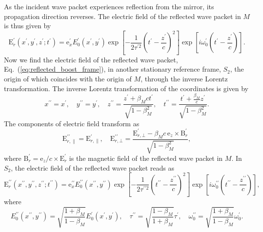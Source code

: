 \documentclass[10pt, a4paper, twoside, openright]{report}
\renewcommand{\vec}[1]{\boldsymbol{\mathrm{#1}}}
\begin{document}
As the incident wave packet experiences reflection from the mirror, its propagation direction reverses. The electric field of the reflected wave packet in $ M $ is thus given by
\begin{equation}\label{eq:reflected_boost_frame}
\vec{E}^{\prime}_r \left(x^{\prime}, y^{\prime}, z^{\prime}; t^{\prime} \right) = \vec{e}_x^{\prime} E^{\prime}_0 \left(x^{\prime}, y^{\prime} \right) \exp \left[ - \frac{1}{2\tau^{\prime 2}} \left(t^{\prime} - \frac{z^{\prime}}{c}\right)^2 \right] \exp \left[ i \omega_0^{\prime} \left(t^{\prime} - \frac{z^{\prime}}{c}\right) \right].
\end{equation}
Now we find the electric field of the reflected wave packet, Eq.~(\ref{eq:reflected_boost_frame}), in another stationary reference frame, $ S_2 $, the origin of which coincides with the origin of $ M $, through the inverse Lorentz transformation. The inverse Lorentz transformation of the coordinates is given by
\begin{equation}\label{eq:inverse_lorentz_transform_coords}
x^{\prime \prime} = x^{\prime}, \quad y^{\prime \prime} = y^{\prime}, \quad z^{\prime \prime} = \frac{z^{\prime} + \beta_M c t^{\prime}}{\sqrt{1 - \beta_M^2}}, \quad t^{\prime \prime} = \frac{t^{\prime} + \frac{\beta_M}{c} z^{\prime}}{\sqrt{1 - \beta_M^2}}.
\end{equation}
The components of electric field transform as
\begin{equation}\label{eq:inverse_lorentz_transform_fields}
\vec{E}^{\prime \prime}_{r, \parallel} = \vec{E}^{\prime}_{r, \parallel}, \quad \vec{E}^{\prime \prime}_{r, \bot} = \frac{\vec{E}^{\prime}_{r, \bot} - \beta_M c \, \vec{e}_z \times \vec{B}^{\prime}_{r}}{\sqrt{1 - \beta_M^2}},
\end{equation}
where $ \vec{B}^{\prime}_{r} = \vec{e}_z / c \times \vec{E}^{\prime}_r $ is the magnetic field of the reflected wave packet in $ M $. In $ S_2 $, the electric field of the reflected wave packet reads as
\begin{equation}\label{eq:reflected_lab_frame_1}
\vec{E}^{\prime \prime}_r \left(x^{\prime \prime}, y^{\prime \prime}, z^{\prime \prime}; t^{\prime \prime} \right) = \vec{e}_x^{\prime \prime} E^{\prime \prime}_0 \left(x^{\prime \prime}, y^{\prime \prime} \right) \exp \left[ - \frac{1}{2 \tau^{\prime \prime 2}} \left(t^{\prime \prime} - \frac{z^{\prime \prime}}{c}\right)^2 \right] \exp \left[ i \omega_0^{\prime \prime} \left(t^{\prime \prime} - \frac{z^{\prime \prime}}{c}\right) \right],
\end{equation}
where
\begin{equation}\label{eq:coeff_lab}
E^{\prime \prime}_0 \left(x^{\prime \prime}, y^{\prime \prime} \right) = \sqrt{\frac{1 + \beta_M}{1 - \beta_M}} E^{\prime}_0 \left(x^{\prime}, y^{\prime} \right), \quad \tau^{\prime \prime} = \sqrt{\frac{1 - \beta_M}{1 + \beta_M}} \tau^{\prime}, \quad \omega_0^{\prime \prime} = \sqrt{\frac{1 + \beta_M}{1 - \beta_M}} \omega_0^{\prime}.
\end{equation}
\end{document}
